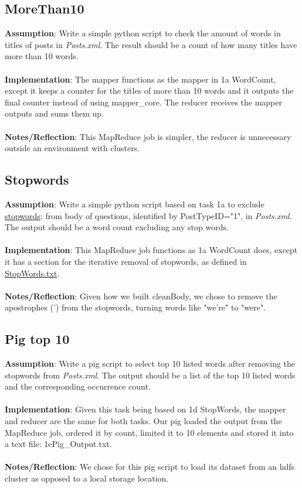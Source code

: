 \documentclass[fleqn,10pt]{wlscirep}
\begin{document}
\subsection{MoreThan10}
\textbf{Assumption}: Write a simple python script to check the amount of words in titles of posts in \textit{Posts.xml}. The result should be a count of how many titles have more than 10 words. \\ \\
\textbf{Implementation}: The mapper functions as the mapper in 1a WordCount, except it keeps a counter for the titles of more than 10 words and it outputs the final counter instead of using mapper\_core.
The reducer receives the mapper outputs and sums them up. \\ \\
\textbf{Notes/Reflection}: This MapReduce job is simpler, the reducer is unnecessary outside an environment with clusters.


\subsection{Stopwords}
\textbf{Assumption}: Write a simple python script based on task 1a to exclude \href{https://raw.githubusercontent.com/naimdjon/stopwords/master/stopwords.txt}{stopwords}: from body of questions, identified by PostTypeID="1", in \textit{Posts.xml}. The output should be a word count excluding any stop words. \\ \\
\textbf{Implementation}: This MapReduce job functions as 1a WordCount does, except it has a section for the iterative removal of stopwords, as defined in \href{https://raw.githubusercontent.com/naimdjon/stopwords/master/stopwords.txt}{StopWords.txt}. \\ \\
\textbf{Notes/Reflection}: Given how we built cleanBody, we chose to remove the apostrophes (') from the stopwords, turning words like "we're" to "were".



\subsection{Pig top 10}
\textbf{Assumption}: Write a pig script to select top 10 listed words after removing the stopwords from \textit{Posts.xml}. The output should be a list of the top 10 listed words and the corresponding occurrence count.\\ \\
\textbf{Implementation}: Given this task being based on 1d StopWords, the mapper and reducer are the same for both tasks. Our pig loaded the output from the MapReduce job, ordered it by count, limited it to 10 elements and stored it into a text file: 1ePig\_Output.txt. \\ \\
\textbf{Notes/Reflection}: We chose for this pig script to load its dataset from an hdfs cluster as opposed to a local storage location.

\end{document}
